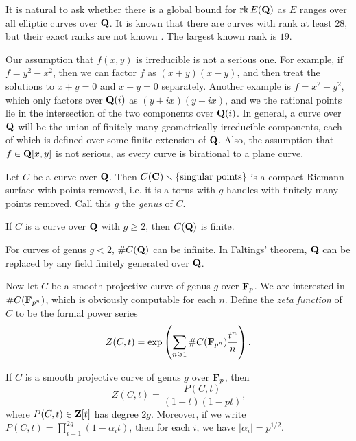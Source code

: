 It is natural to ask whether there is a global bound for $\operatorname{rk} E(\mathbf{Q})$ as 
$E$ ranges over all elliptic curves over $\mathbf{Q}$. 
It is known that there are curves with rank at least $28$, but their exact 
ranks are not known \cite{du}. The largest known rank is $19$.  

Our assumption that $f(x,y)$ is irreducible is not a serious one. For example, 
if $f=y^2-x^2$, then we can factor $f$ as $(x+y)(x-y)$, and then treat the 
solutions to $x+y=0$ and $x-y=0$ separately. Another example is $f=x^2+y^2$, 
which only factors over $\mathbf{Q}(i)$ as $(y+i x)(y-i x)$, and we the rational 
points lie in the intersection of the two components over $\mathbf{Q}(i)$. In general, 
a curve over $\mathbf{Q}$ will be the union of finitely many geometrically irreducible 
components, each of which is defined over some finite extension of $\mathbf{Q}$. Also, 
the assumption that $f\in \mathbf{Q}[x,y]$ is not serious, as every curve is 
birational to a plane curve. 

Let $C$ be a curve over $\mathbf{Q}$. Then 
$C(\mathbf{C})\smallsetminus \{\text{singular points}\}$ is a compact Riemann 
surface with points removed, i.e. it is a torus with $g$ handles with finitely 
many points removed. Call this $g$ the \emph{genus} of $C$. 

\begin{theorem}
If $C$ is a curve over $\mathbf{Q}$ with $g\geqslant 2$, then $C(\mathbf{Q})$ 
is finite. 
\end{theorem}

For curves of genus $g<2$, $\# C(\mathbf{Q})$ can be infinite. In Faltings' 
theorem, $\mathbf{Q}$ can be replaced by any field finitely generated over 
$\mathbf{Q}$. 

Now let $C$ be a smooth projective curve of genus $g$ over $\mathbf{F}_p$. 
We are interested in $\#C(\mathbf{F}_{p^n})$, which is obviously computable 
for each $n$. Define the \emph{zeta function} of $C$ to be the formal power 
series 
\[
  Z(C,t) = \exp\left( \sum_{n\geqslant 1} \# C(\mathbf{F}_{p^n}) \frac{t^n}{n} \right) \text{.}
\]

\begin{theorem}[Weil]\label{thm:Weil-curve}
If $C$ is a smooth projective curve of genus $g$ over $\mathbf{F}_p$, then 
\[
  Z(C,t) = \frac{P(C,t)}{(1-t)(1-p t)} \text{,}
\]
where $P(C,t)\in \mathbf{Z}[t]$ has degree $2 g$. Moreover, if we write
$P(C,t) = \prod_{i=1}^{2 g} (1-\alpha_i t)$, then for each $i$, we have 
$|\alpha_i|=p^{1/2}$. 
\end{theorem}

